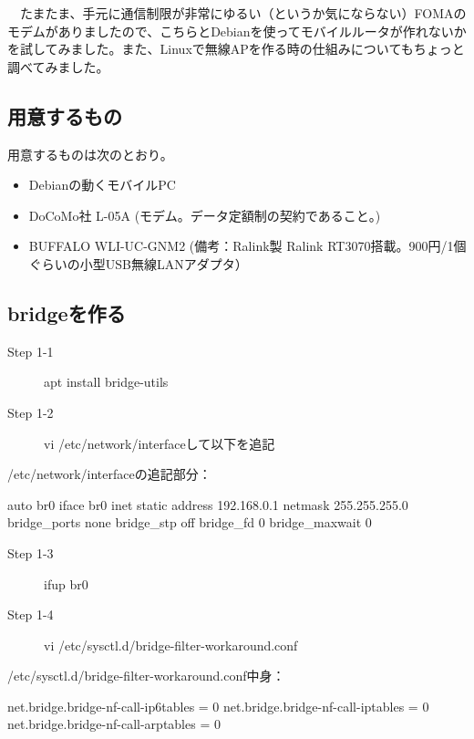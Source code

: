 \documentclass[mingoth,a4paper]{jsarticle}
\begin{document}
　たまたま、手元に通信制限が非常にゆるい（というか気にならない）FOMAのモデムがありましたので、こちらとDebianを使ってモバイルルータが作れないかを試してみました。また、Linuxで無線APを作る時の仕組みについてもちょっと調べてみました。
 


\subsection{用意するもの}

  用意するものは次のとおり。

  \begin{itemize}
  \item Debianの動くモバイルPC
  \item DoCoMo社 L-05A (モデム。データ定額制の契約であること。)
  \item BUFFALO WLI-UC-GNM2 (備考：Ralink製 Ralink RT3070搭載。900円/1個ぐらいの小型USB無線LANアダプタ）
  \end{itemize}    



\subsection{bridgeを作る}

  \begin{description}
    \item [Step 1-1] apt install bridge-utils
    \item [Step 1-2] vi /etc/network/interfaceして以下を追記
  \end{description}      
 /etc/network/interfaceの追記部分：
\begin{commandline}
auto br0
iface br0 inet static
        address 192.168.0.1
        netmask 255.255.255.0
        bridge_ports none
        bridge_stp off
        bridge_fd 0
        bridge_maxwait 0
\end{commandline}

  \begin{description}
    \item [Step 1-3] ifup br0
    \item [Step 1-4] vi /etc/sysctl.d/bridge-filter-workaround.conf
  \end{description}      
/etc/sysctl.d/bridge-filter-workaround.conf中身：
\begin{commandline}
net.bridge.bridge-nf-call-ip6tables = 0
net.bridge.bridge-nf-call-iptables = 0
net.bridge.bridge-nf-call-arptables = 0
\end{commandline}
\end{document}
